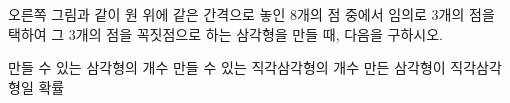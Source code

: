 \noindent\begin{minipage}[t]{0.58\linewidth}\vspace{0pt}\raggedright 오른쪽 그림과 같이 원 위에 같은 간격으로 놓인 8개의 점 중에서 임의로 3개의 점을 택하여 그 3개의 점을 꼭짓점으로 하는 삼각형을 만들 때, 다음을 구하시오.\end{minipage}\hfill\begin{minipage}[t]{0.4\linewidth}\vspace{0pt}\centering \resizebox{\ifdim\width>\linewidth\linewidth\else\width\fi}{!}{}\end{minipage}\par
{} 만들 수 있는 삼각형의 개수
 만들 수 있는 직각삼각형의 개수
 만든 삼각형이 직각삼각형일 확률
